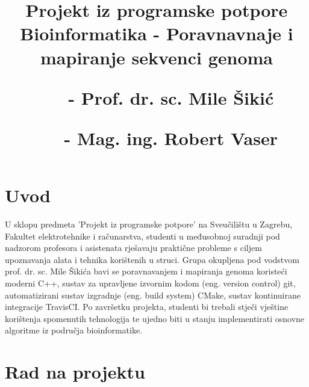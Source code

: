 \documentclass[times, 12pt, utf8]{article}
\begin{document}
	
	\begin{titlepage}
		\clearpage
		\thispagestyle{empty}
		
		\title{
			{\large Projekt iz programske potpore} \\
			{ \textbf{Bioinformatika - Poravnavnaje i mapiranje sekvenci genoma} }
			
			\vbox{}
			\vspace{0.5cm}
			
			\footnotesize{
				\begin{itemize}[leftmargin=3.5cm]
					\setlength{\itemindent}{0.8cm}
					
					Voditelji: 
					\item[-] Prof. dr. sc. Mile Šikić
					\item[-] Mag. ing. Robert Vaser
				\end{itemize}
				
			}
			
			\date{}
		}
		
		\clearpage
	\end{titlepage}
	
	\maketitle
	
	\newpage
	\clearpage
	
	\tableofcontents
	
	\newpage
	\clearpage
	
	\section{Uvod}
	U sklopu predmeta 'Projekt iz programske potpore' na Sveučilištu u Zagrebu,
	Fakultet elektrotehnike i računarstva, studenti u međusobnoj suradnji 
	pod nadzorom profesora i asistenata rješavaju praktične probleme
	s ciljem upoznavanja alata i tehnika korištenih u struci. Grupa 
	okupljena pod vodstvom prof. dr. sc. Mile Šikića bavi se 
	poravnavanjem i mapiranja genoma koristeći moderni C++,
	sustav za upravljene izvornim kodom (eng. version control) git,
	automatizirani sustav izgradnje (eng. build system) CMake,
	sustav kontinuirane integracije TravisCI.
	Po završetku projekta, studenti bi trebali stječi vještine 
	korištenja spomenutih tehnologija te ujedno biti u stanju 
	implementirati osnovne algoritme iz područja bioinformatike.
	
	\section{Rad na projektu}
	
\end{document}

